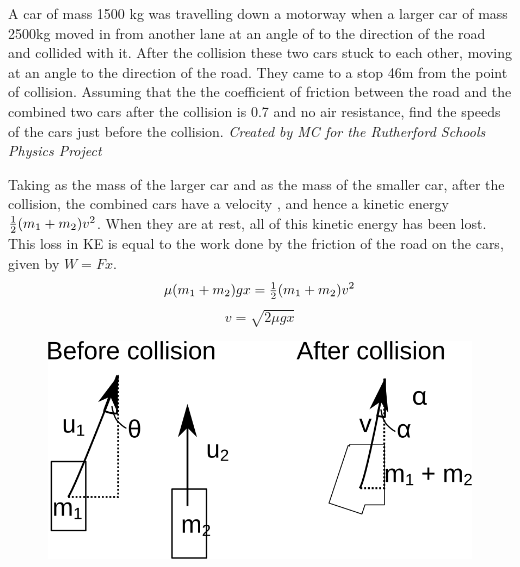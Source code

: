 
%
%
\begin{problem} %
{A car of mass 1500 kg was travelling down a motorway when a larger car of mass 2500kg moved in from another lane at an angle of  to the direction of the road and collided with it. After the collision these two cars stuck to each other, moving at an angle  to the direction of the road. They came to a stop 46m from the point of collision. Assuming that the the coefficient of friction between the road and the combined two cars after the collision is 0.7 and no air resistance, find the speeds of the  cars just before the collision.
}
{\textit{Created by MC for the Rutherford Schools Physics Project}}
{Taking  as the mass of the larger car and  as the mass of the smaller car, after the collision, the combined cars have a velocity , and hence a kinetic energy ${\textstyle \frac{1}{2}} (m_1+m_2) v^2$. When they are at rest, all of this kinetic energy has been lost. This loss in KE is equal to the work done by the friction of the road on the cars, given by $W = Fx$.
\begin{equation} \mu (m_1+m_2)gx = {\textstyle \frac{1}{2}} (m_1+m_2) v^2 \end{equation}
\begin{equation} v = \sqrt{2\mu gx} \end{equation}

\begin{figure}[h]
\centering
\includegraphics[scale =1]{../../../figures/dynamics_l6_car_collision.svg}
\caption{}
\label{fig:dynamics_l6_car_collision}
\end{figure}


}
\end{problem}
